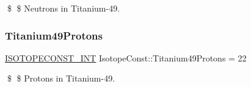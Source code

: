 \$ \$ Neutrons in Titanium-\/49. \mbox{\label{group___isotope_const-_titanium-_ti49_gaff33e3cc8e8e28c358c19a158656808d}} 
\subsubsection{\texorpdfstring{Titanium49\+Protons}{Titanium49Protons}}
{\footnotesize\ttfamily \mbox{\hyperlink{group___isotope_const-_macros_ga5f18360b3e99483a35c32d789e62621c}{I\+S\+O\+T\+O\+P\+E\+C\+O\+N\+S\+T\+\_\+\+I\+NT}} Isotope\+Const\+::\+Titanium49\+Protons = 22}

\$ \$ Protons in Titanium-\/49. 